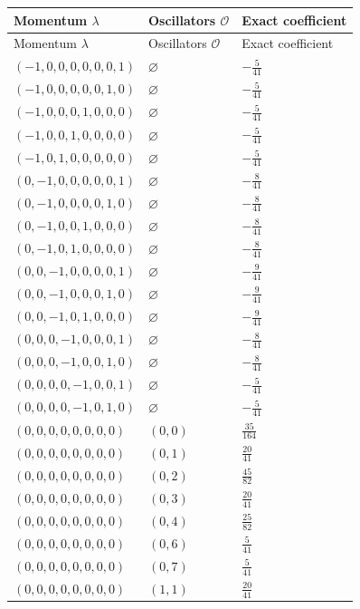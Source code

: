 \begingroup\scriptsize
\setlength{\tabcolsep}{5pt}
\begin{longtable}{@{}lll@{}}
\toprule
Momentum $\lambda$ & Oscillators $\mathcal O$ & Exact coefficient\\
\midrule\endfirsthead
\toprule
Momentum $\lambda$ & Oscillators $\mathcal O$ & Exact coefficient\\
\midrule\endhead
\bottomrule\endfoot
$(-1,0,0,0,0,0,0,1)$ & $\varnothing$ & $-\frac{5}{41}$\\
$(-1,0,0,0,0,0,1,0)$ & $\varnothing$ & $-\frac{5}{41}$\\
$(-1,0,0,0,1,0,0,0)$ & $\varnothing$ & $-\frac{5}{41}$\\
$(-1,0,0,1,0,0,0,0)$ & $\varnothing$ & $-\frac{5}{41}$\\
$(-1,0,1,0,0,0,0,0)$ & $\varnothing$ & $-\frac{5}{41}$\\
$(0,-1,0,0,0,0,0,1)$ & $\varnothing$ & $-\frac{8}{41}$\\
$(0,-1,0,0,0,0,1,0)$ & $\varnothing$ & $-\frac{8}{41}$\\
$(0,-1,0,0,1,0,0,0)$ & $\varnothing$ & $-\frac{8}{41}$\\
$(0,-1,0,1,0,0,0,0)$ & $\varnothing$ & $-\frac{8}{41}$\\
$(0,0,-1,0,0,0,0,1)$ & $\varnothing$ & $-\frac{9}{41}$\\
$(0,0,-1,0,0,0,1,0)$ & $\varnothing$ & $-\frac{9}{41}$\\
$(0,0,-1,0,1,0,0,0)$ & $\varnothing$ & $-\frac{9}{41}$\\
$(0,0,0,-1,0,0,0,1)$ & $\varnothing$ & $-\frac{8}{41}$\\
$(0,0,0,-1,0,0,1,0)$ & $\varnothing$ & $-\frac{8}{41}$\\
$(0,0,0,0,-1,0,0,1)$ & $\varnothing$ & $-\frac{5}{41}$\\
$(0,0,0,0,-1,0,1,0)$ & $\varnothing$ & $-\frac{5}{41}$\\
$(0,0,0,0,0,0,0,0)$ & $(0,0)$ & $\frac{35}{164}$\\
$(0,0,0,0,0,0,0,0)$ & $(0,1)$ & $\frac{20}{41}$\\
$(0,0,0,0,0,0,0,0)$ & $(0,2)$ & $\frac{45}{82}$\\
$(0,0,0,0,0,0,0,0)$ & $(0,3)$ & $\frac{20}{41}$\\
$(0,0,0,0,0,0,0,0)$ & $(0,4)$ & $\frac{25}{82}$\\
$(0,0,0,0,0,0,0,0)$ & $(0,6)$ & $\frac{5}{41}$\\
$(0,0,0,0,0,0,0,0)$ & $(0,7)$ & $\frac{5}{41}$\\
$(0,0,0,0,0,0,0,0)$ & $(1,1)$ & $\frac{20}{41}$\\

\end{longtable}
